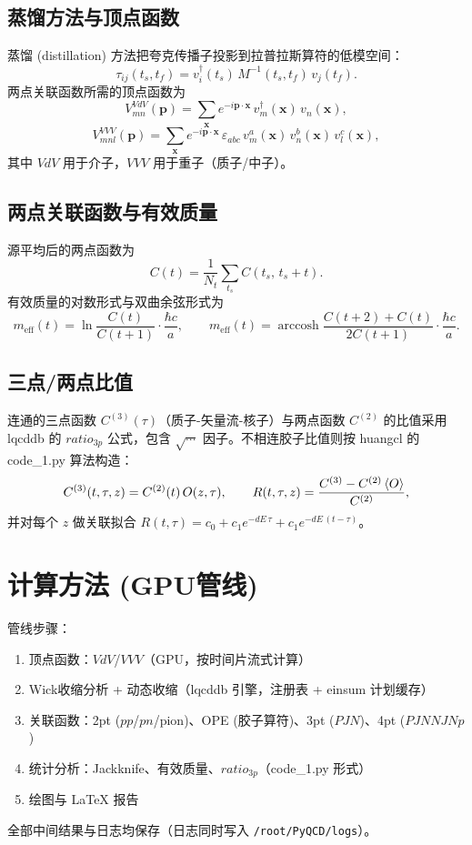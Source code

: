 \documentclass[11pt,a4paper]{article}
\newcommand{\meff}{m_{\mathrm{eff}}}
\newcommand{\Nt}{N_t}
\begin{document}
\subsection{蒸馏方法与顶点函数}
蒸馏 (distillation) 方法把夸克传播子投影到拉普拉斯算符的低模空间：
\[ \tau_{ij}(t_s,t_f) = v^\dagger_i(t_s)\, M^{-1}(t_s,t_f)\, v_j(t_f). \]
两点关联函数所需的顶点函数为
\begin{equation}
V^{VdV}_{mn}(\mathbf{p}) = \sum_{\mathbf{x}} e^{-i\mathbf{p}\cdot\mathbf{x}}\,
    v^\dagger_m(\mathbf{x})\, v_n(\mathbf{x}),
\label{eq:VdV}
\end{equation}
\begin{equation}
V^{VVV}_{m n l}(\mathbf{p}) = \sum_{\mathbf{x}} e^{-i\mathbf{p}\cdot\mathbf{x}}\,
    \varepsilon_{abc}\, v^a_m(\mathbf{x})\, v^b_n(\mathbf{x})\, v^c_l(\mathbf{x}),
\label{eq:VVV}
\end{equation}
其中 $VdV$ 用于介子，$VVV$ 用于重子（质子/中子）。

\subsection{两点关联函数与有效质量}
源平均后的两点函数为
\[ C(t) = \frac{1}{\Nt}\sum_{t_s} C(t_s,\, t_s + t). \]
有效质量的对数形式与双曲余弦形式为
\begin{equation}
\meff(t) = \ln\frac{C(t)}{C(t+1)}\cdot\frac{\hbar c}{a}, \qquad
\meff(t) = \operatorname{arccosh}\frac{C(t+2)+C(t)}{2C(t+1)}\cdot\frac{\hbar c}{a}.
\label{eq:meff}
\end{equation}

\subsection{三点/两点比值}
连通的三点函数 $C^{(3)}(\tau)$（质子-矢量流-核子）与两点函数 $C^{(2)}$ 的比值采用
lqcddb 的 $ratio_{3p}$ 公式，包含 $\sqrt{\cdots}$ 因子。不相连胶子比值则按
huangcl 的 code\_1.py 算法构造：
\begin{equation}
C^{(3)}(t, \tau, z) = C^{(2)}(t)\, O(z,\tau),
\qquad R(t,\tau,z) = \frac{C^{(3)} - C^{(2)}\braket{O}}{C^{(2)}},
\end{equation}
并对每个 $z$ 做关联拟合 $R(t,\tau) = c_0 + c_1 e^{-dE\,\tau} + c_1 e^{-dE\,(t-\tau)}$。

\section{计算方法 (GPU管线)}
管线步骤：
\begin{enumerate}
    \item 顶点函数：$VdV$/$VVV$（GPU，按时间片流式计算）
    \item Wick收缩分析 + 动态收缩（lqcddb 引擎，注册表 + einsum 计划缓存）
    \item 关联函数：2pt ($pp$/$pn$/pion)、OPE (胶子算符)、3pt ($PJN$)、4pt ($PJNNJNp$)
    \item 统计分析：Jackknife、有效质量、$ratio_{3p}$（code\_1.py 形式）
    \item 绘图与 LaTeX 报告
\end{enumerate}
全部中间结果与日志均保存（日志同时写入 \texttt{/root/PyQCD/logs}）。
\end{document}
